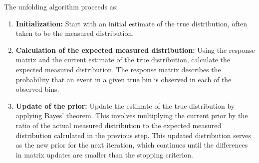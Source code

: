         The unfolding algorithm proceeds as: 
        \begin{enumerate}
            \item \textbf{Initialization:} Start with an initial estimate of the true distribution, often taken to be the measured distribution. 
        
            \item \textbf{Calculation of the expected measured distribution:} Using the response matrix and the current estimate of the true distribution, calculate the expected measured distribution. The response matrix describes the probability that an event in a given true bin is observed in each of the observed bins.
        
            \item \textbf{Update of the prior:} Update the estimate of the true distribution by applying Bayes' theorem. This involves multiplying the current prior by the ratio of the actual measured distribution to the expected measured distribution calculated in the previous step. This updated distribution serves as the new prior for the next iteration, which continues until the differences in matrix updates are smaller than the stopping criterion. 

        
        \end{enumerate}

        
